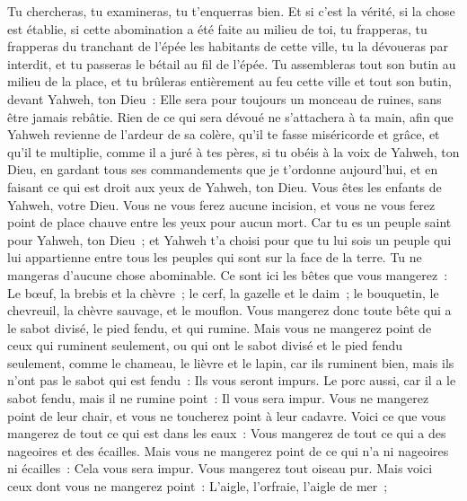 \begin{multicols}{2}
Tu chercheras, tu examineras, tu t'enquerras bien. Et si c'est la vérité, si la chose est établie, si cette abomination a été faite au milieu de toi,
tu frapperas, tu frapperas du tranchant de l'épée les habitants de cette ville, tu la dévoueras par interdit, et tu passeras le bétail au fil de l'épée.
Tu assembleras tout son butin au milieu de la place, et tu brûleras entièrement au feu cette ville et tout son butin, devant Yahweh, ton Dieu~: Elle sera pour toujours un monceau de ruines, sans être jamais rebâtie.
Rien de ce qui sera dévoué ne s'attachera à ta main, afin que Yahweh revienne de l'ardeur de sa colère, qu'il te fasse miséricorde et grâce, et qu'il te multiplie, comme il a juré à tes pères,
si tu obéis à la voix de Yahweh, ton Dieu, en gardant tous ses commandements que je t'ordonne aujourd'hui, et en faisant ce qui est droit aux yeux de Yahweh, ton Dieu.
\VerseOne{}Vous êtes les enfants de Yahweh, votre Dieu. Vous ne vous ferez aucune incision, et vous ne vous ferez point de place chauve entre les yeux pour aucun mort.
Car tu es un peuple saint pour Yahweh, ton Dieu~; et Yahweh t'a choisi pour que tu lui sois un peuple qui lui appartienne entre tous les peuples qui sont sur la face de la terre.
Tu ne mangeras d'aucune chose abominable.
Ce sont ici les bêtes que vous mangerez~: Le bœuf, la brebis et la chèvre~;
le cerf, la gazelle et le daim~; le bouquetin, le chevreuil, la chèvre sauvage, et le mouflon.
Vous mangerez donc toute bête qui a le sabot divisé, le pied fendu, et qui rumine.
Mais vous ne mangerez point de ceux qui ruminent seulement, ou qui ont le sabot divisé et le pied fendu seulement, comme le chameau, le lièvre et le lapin, car ils ruminent bien, mais ils n'ont pas le sabot qui est fendu~: Ils vous seront impurs.
Le porc aussi, car il a le sabot fendu, mais il ne rumine point~: Il vous sera impur. Vous ne mangerez point de leur chair, et vous ne toucherez point à leur cadavre.
Voici ce que vous mangerez de tout ce qui est dans les eaux~: Vous mangerez de tout ce qui a des nageoires et des écailles.
Mais vous ne mangerez point de ce qui n'a ni nageoires ni écailles~: Cela vous sera impur.
Vous mangerez tout oiseau pur.
Mais voici ceux dont vous ne mangerez point~: L'aigle, l'orfraie, l'aigle de mer~;

\end{multicols}
